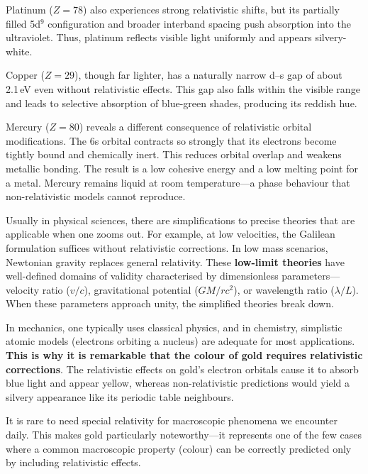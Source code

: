 Platinum ($Z = 78$) also experiences strong relativistic shifts, but its partially filled 5d$^9$ configuration and broader interband spacing push absorption into the ultraviolet. Thus, platinum reflects visible light uniformly and appears silvery-white.

Copper ($Z = 29$), though far lighter, has a naturally narrow d–s gap of about 2.1 eV even without relativistic effects. This gap also falls within the visible range and leads to selective absorption of blue-green shades, producing its reddish hue.

Mercury ($Z = 80$) reveals a different consequence of relativistic orbital modifications. The 6s orbital contracts so strongly that its electrons become tightly bound and chemically inert. This reduces orbital overlap and weakens metallic bonding. The result is a low cohesive energy and a low melting point for a metal. Mercury remains liquid at room temperature—a phase behaviour that non-relativistic models cannot reproduce.

\begin{commentary}
  Usually in physical sciences, there are simplifications to precise theories that are applicable when one \QSOpen{}zooms out.\QSClose{} For example, at low velocities, the Galilean formulation suffices without relativistic corrections. In low mass scenarios, Newtonian gravity replaces general relativity. These \textbf{\QSOpen{}low-limit theories\QSClose{}} have well-defined domains of validity characterised by dimensionless parameters—velocity ratio ($v/c$), gravitational potential ($GM/rc^2$), or wavelength ratio ($\lambda/L$). When these parameters approach unity, the simplified theories break down.
  
  In mechanics, one typically uses classical physics, and in chemistry, simplistic atomic models (electrons \QSOpen{}orbiting\QSClose{} a nucleus) are adequate for most applications. \textbf{This is why it is remarkable that the colour of gold requires relativistic corrections}. The relativistic effects on gold's electron orbitals cause it to absorb blue light and appear yellow, whereas non-relativistic predictions would yield a silvery appearance like its periodic table neighbours.
  
  It is rare to need special relativity for macroscopic phenomena we encounter daily. This makes gold particularly noteworthy—it represents one of the few cases where a common macroscopic property (colour) can be correctly predicted only by including relativistic effects.
\end{commentary}